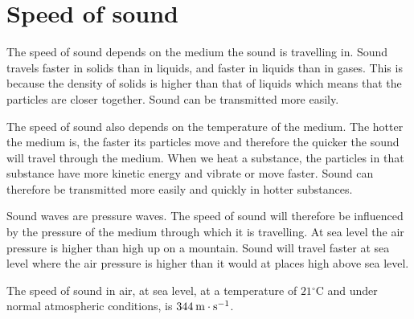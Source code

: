             \section{Speed of sound}
            \nopagebreak
      \label{m38799*id183885}The speed of sound depends on the medium the sound is travelling in. Sound travels faster in solids than in liquids, and faster in liquids than in gases. This is because the density of solids is higher than that of liquids which means that the particles are closer together. Sound can be transmitted more easily.\par 
      \label{m38799*id183891}The speed of sound also depends on the temperature of the medium. The hotter the medium is, the faster its particles move and therefore the quicker the sound will travel through the medium. When we heat a substance, the particles in that substance have more kinetic energy and vibrate or move faster. Sound can therefore be transmitted more easily and quickly in hotter substances.\par 
      \label{m38799*id183897}Sound waves are pressure waves. The speed of sound will therefore be influenced by the pressure of the medium through which it is travelling. At sea level the air pressure is higher than high up on a mountain. Sound will travel faster at sea level where the air pressure is higher than it would at places high above sea level.\par 


 { \label{m38799*meaningfhsst!!!underscore!!!id164}
     The speed of sound in air, at sea level, at a temperature of $21{}^{\circ }\text{C}$ and under normal atmospheric conditions, is $344\phantom{\rule{2pt}{0ex}}\text{m}\ensuremath{\cdot}\text{s}{}^{-1}$. 
       } 

